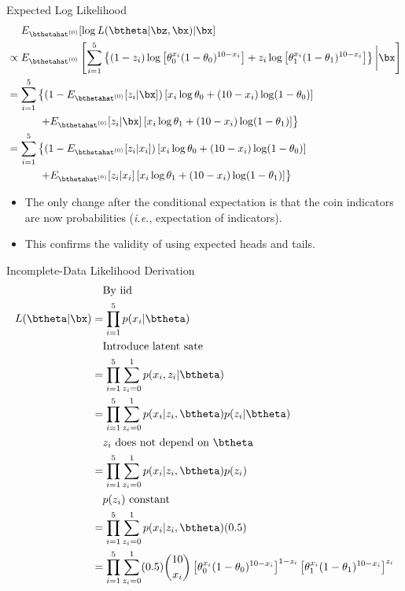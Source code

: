 \documentclass[dvipdfmx,bigger,aspectratio=169]{beamer}
\begin{document}
\begin{frame}[allowframebreaks,label=,t]{Expected Log Likelihood}
\begin{align*}
\label{eq:org12b665e}
  &~~~~E_{\bthetahat^{(0)}}[\log L(\btheta | \bz,\bx) | \bx]\\
  &\propto E_{\bthetahat^{(0)}} \left[ \sum^{5}_{i=1}
    \left\{
    (1-z_{i}) \log \left[ \theta_{0}^{x_{i}}(1-\theta_{0})^{10-x_{i}} \right] +
    z_{i} \log \left[ \theta_{1}^{x_{i}}(1-\theta_{1})^{10-x_{i}} \right]
    \right\} \bigg| \bx \right]\\
  &= \sum^{5}_{i=1}
    \left\{
    (1- E_{\bthetahat^{(0)}}[z_{i} | \bx]) \left[ x_{i}\log\theta_{0} + (10-x_{i})\log(1-\theta_{0})\right]
    \right.\\
  &~~~~~~~~~ \left.
    + E_{\bthetahat^{(0)}}[z_{i} | \bx] \left[ x_{i}\log\theta_{1} + (10-x_{i})\log(1-\theta_{1})\right]
    \right\}\\
  &= \sum^{5}_{i=1}
    \left\{
    (1- E_{\bthetahat^{(0)}}[z_{i} | x_{i}]) \left[ x_{i}\log\theta_{0} + (10-x_{i})\log(1-\theta_{0})\right]
    \right.\\
  &~~~~~~~~~ \left.
    + E_{\bthetahat^{(0)}}[z_{i} | x_{i}] \left[ x_{i}\log\theta_{1} + (10-x_{i})\log(1-\theta_{1})\right]
    \right\}
\end{align*}
\begin{itemize}
\item The only change after the conditional expectation is that the coin indicators are now probabilities (\textit{i.e.}, expectation of indicators).
\item This confirms the validity of using expected heads and tails.
\end{itemize}
\end{frame}

\begin{frame}[allowframebreaks,label=,t]{Incomplete-Data Likelihood Derivation}
\begin{align*}
\label{eq:orgeaa8e48}
  &~~~\text{By iid}\\
  L(\btheta | \bx)
  &= \prod^{5}_{i=1}p(x_{i} | \btheta)\\
  &~~~\text{Introduce latent sate}\\
  &= \prod^{5}_{i=1} \sum^{1}_{z_{i}=0} p(x_{i}, z_{i} | \btheta)\\
  &= \prod^{5}_{i=1} \sum^{1}_{z_{i}=0} p(x_{i} | z_{i}, \btheta) p(z_{i} | \btheta)\\
  &~~~\text{$z_{i}$ does not depend on $\btheta$}\\
  &= \prod^{5}_{i=1} \sum^{1}_{z_{i}=0} p(x_{i} | z_{i}, \btheta) p(z_{i})\\
  &~~~\text{$p(z_{i})$ constant}\\
  &= \prod^{5}_{i=1} \sum^{1}_{z_{i}=0} p(x_{i} | z_{i}, \btheta) (0.5)\\
  &= \prod^{5}_{i=1} \sum^{1}_{z_{i}=0}
    (0.5) \binom{10}{x_{i}}
    \left[ \theta_{0}^{x_{i}}(1-\theta_{0})^{10-x_{i}} \right]^{1-z_{i}}
    \left[ \theta_{1}^{x_{i}}(1-\theta_{1})^{10-x_{i}} \right]^{z_{i}}\\
\end{align*}
\end{frame}
\end{document}
